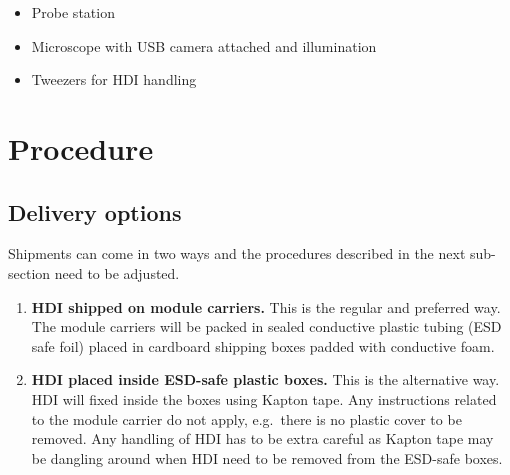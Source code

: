 \documentclass[12pt]{unlsilabsop}
\begin{document}
\begin{itemize}
    \item Probe station
    \item Microscope with USB camera attached and illumination
    \item Tweezers for HDI handling
\end{itemize}

\section{Procedure}

\subsection{Delivery options}
Shipments can come in two ways and the procedures described in the next sub-section need to be adjusted.
\begin{enumerate}
    \item \textbf{HDI shipped on module carriers.} This is the regular and preferred way. The module carriers will be packed in sealed conductive plastic tubing (ESD safe foil) placed in cardboard shipping boxes padded with conductive foam.
    \item \textbf{HDI placed inside ESD-safe plastic boxes.} This is the alternative way. HDI will fixed inside the boxes using Kapton tape. Any instructions related to the module carrier do not apply, e.g.~there is no plastic cover to be removed. Any handling of HDI has to be extra careful as Kapton tape may be dangling around when HDI need to be removed from the ESD-safe boxes.
\end{enumerate}
\end{document}
